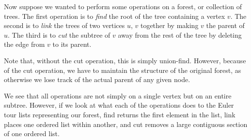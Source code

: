 \begin{center}
{
}
\end{center}

Now suppose we wanted to perform some operations on a forest, or collection of trees. The first operation is to \textit{find} the root of the tree containing a vertex $v$. The second is to \textit{link} the trees of two vertices $u$, $v$ together by making $v$ the parent of $u$. The third is to \textit{cut} the subtree of $v$ away from the rest of the tree by deleting the edge from $v$ to its parent.

Note that, without the cut operation, this is simply union-find. However, because of the cut operation, we have to maintain the structure of the original forest, as otherwise we lose track of the actual parent of any given node.

We see that all operations are not simply on a single vertex but on an entire subtree. However, if we look at what each of the operations does to the Euler tour lists representing our forest, find returns the first element in the list, link places one ordered list within another, and cut removes a large contiguous section of one ordered list.

